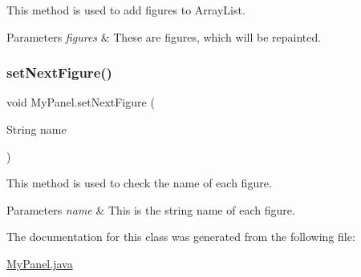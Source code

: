 This method is used to add figures to Array\+List. 
\begin{DoxyParams}{Parameters}
{\em figures} & These are figures, which will be repainted. \\
\hline
\end{DoxyParams}
\mbox{\label{class_my_panel_a3a1214eb7ae2f5d5bb1cdb21d8a4b097}} 
\subsubsection{\texorpdfstring{setNextFigure()}{setNextFigure()}}
{\footnotesize\ttfamily void My\+Panel.\+set\+Next\+Figure (\begin{DoxyParamCaption}\item[{String}]{name }\end{DoxyParamCaption})}

This method is used to check the name of each figure. 
\begin{DoxyParams}{Parameters}
{\em name} & This is the string name of each figure. \\
\hline
\end{DoxyParams}


The documentation for this class was generated from the following file\+:\begin{DoxyCompactItemize}
\item 
\mbox{\hyperlink{_my_panel_8java}{My\+Panel.\+java}}\end{DoxyCompactItemize}
